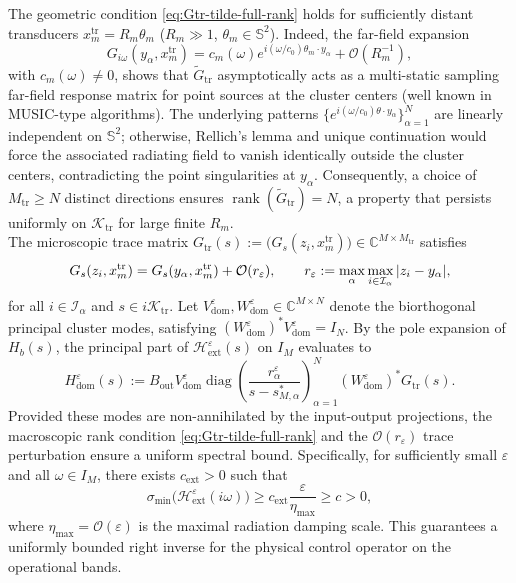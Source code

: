 \documentclass[11pt,a4paper]{article}
\numberwithin{equation}{section}
\begin{document}
\bigskip

\noindent
The geometric condition \eqref{eq:Gtr-tilde-full-rank} holds for sufficiently distant transducers $x_m^{\mathrm{tr}} = R_m \theta_m$ ($R_m \gg 1$, $\theta_m \in \mathbb{S}^2$). Indeed, the far-field expansion 
$$G_{i\omega}(y_\alpha,x_m^{\mathrm{tr}}) = c_m(\omega) e^{i(\omega/c_0)\theta_m\cdot y_\alpha} + \mathcal{O}(R_m^{-1}),$$
with $c_m(\omega) \neq 0$, shows that $\widetilde{G}_{\mathrm{tr}}$ asymptotically acts as a multi-static sampling far-field response matrix for point sources at the cluster centers (well known in MUSIC-type algorithms). The underlying patterns $\{e^{i(\omega/c_0)\theta \cdot y_\alpha}\}_{\alpha=1}^N$ are linearly independent on $\mathbb{S}^2$; otherwise, Rellich's lemma and unique continuation would force the associated radiating field to vanish identically outside the cluster centers, contradicting the point singularities at $y_\alpha$. Consequently, a choice of $M_{\mathrm{tr}} \ge N$ distinct directions ensures $\operatorname{rank}(\widetilde{G}_{\mathrm{tr}}) = N$, a property that persists uniformly on $\mathcal{K}_{\mathrm{tr}}$ for large finite $R_m$.
\\
\noindent
The microscopic trace matrix $G_{\mathrm{tr}}(s) := \bigl(G_s(z_i,x_m^{\mathrm{tr}})\bigr) \in \mathbb{C}^{M\times M_{\mathrm{tr}}}$ satisfies
\begin{equation}
\label{eq:Gtr-cluster-perturbation}
  G_s(z_i,x_m^{\rm tr})=G_s(y_\alpha,x_m^{\rm tr})+\mathcal O(r_\varepsilon),
  \qquad
  r_\varepsilon:=\max_\alpha\max_{i\in\mathcal I_\alpha}|z_i-y_\alpha|,
\end{equation}
for all $i \in \mathcal{I}_\alpha$ and $s \in i\mathcal{K}_{\mathrm{tr}}$. Let $V_{\mathrm{dom}}^\varepsilon, W_{\mathrm{dom}}^\varepsilon \in \mathbb{C}^{M\times N}$ denote the biorthogonal principal cluster modes, satisfying $(W_{\mathrm{dom}}^\varepsilon)^\ast V_{\mathrm{dom}}^\varepsilon = I_N$. By the pole expansion of $H_b(s)$, the principal part of $\mathcal{H}_{\mathrm{ext}}^\varepsilon(s)$ on $I_M$ evaluates to
\begin{equation}
\label{eq:Hdom-explicit-definition}
    H_{\mathrm{dom}}^\varepsilon(s) := B_{\mathrm{out}} V_{\mathrm{dom}}^\varepsilon \operatorname{diag}\left(\frac{r_\alpha^\varepsilon}{s-s_{M,\alpha}^\ast}\right)_{\alpha=1}^N (W_{\mathrm{dom}}^\varepsilon)^\ast G_{\mathrm{tr}}(s) .
\end{equation}
Provided these modes are non-annihilated by the input-output projections, the macroscopic rank condition \eqref{eq:Gtr-tilde-full-rank} and the $\mathcal{O}(r_\varepsilon)$ trace perturbation ensure a uniform spectral bound. Specifically, for sufficiently small $\varepsilon$ and all $\omega \in I_M$, there exists $c_{\mathrm{ext}} > 0$ such that
\begin{equation}
\label{eq:Hext-smin-lower}
    \sigma_{\min}\bigl(\mathcal{H}_{\mathrm{ext}}^\varepsilon(i\omega)\bigr) \ge c_{\mathrm{ext}}\frac{\varepsilon}{\eta_{\max}} \ge c > 0,
\end{equation}
where $\eta_{\max} = \mathcal{O}(\varepsilon)$ is the maximal radiation damping scale. This guarantees a uniformly bounded right inverse for the physical control operator on the operational bands.
\end{document}
